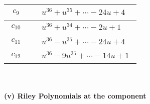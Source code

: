 \documentclass[1p]{elsarticle_modified}
\theoremstyle{definition}
\begin{document}
\begin{tabular}{m{50pt}|m{274pt}}
\hline $$\begin{aligned}c_{9}\end{aligned}$$&$\begin{aligned}
&u^{36}+u^{35}+\cdots-24 u+4
\end{aligned}$\\
\hline $$\begin{aligned}c_{10}\end{aligned}$$&$\begin{aligned}
&u^{36}+u^{34}+\cdots-2 u+1
\end{aligned}$\\
\hline $$\begin{aligned}c_{11}\end{aligned}$$&$\begin{aligned}
&u^{36}- u^{35}+\cdots-24 u+4
\end{aligned}$\\
\hline $$\begin{aligned}c_{12}\end{aligned}$$&$\begin{aligned}
&u^{36}-9 u^{35}+\cdots-14 u+1
\end{aligned}$\\
\hline
\end{tabular}\\~\\
\newpage\renewcommand{\arraystretch}{1}
\flushleft \textbf{(v) Riley Polynomials at the component}\newline \\
\end{document}
